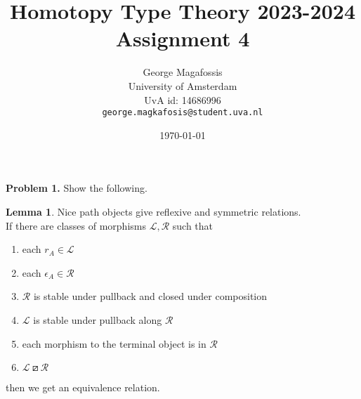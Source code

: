 \documentclass{article}
\title{Homotopy Type Theory 2023-2024\\
       Assignment 4
      }
\date{\today}
\author{George Magafossis \\
University of Amsterdam \\
UvA id: 14686996 \\
\texttt{george.magkafosis@student.uva.nl}}
\theoremstyle{definition}
\newtheorem{lemma}[definition]{Lemma}
\begin{document}
\maketitle

\noindent\textbf{Problem 1.} Show the following.

\begin{lemma}
    \label{lem:equivalence relation}
    Nice path objects give reflexive and symmetric relations. \\
    If there are classes of morphisms $\mathcal L, \mathcal R$ such that
    \begin{enumerate}[(1)]
     \item each $r_A \in \mathcal L$
     \item each $\epsilon_A \in \mathcal R$
     \item $\mathcal R$ is stable under pullback and closed under composition
     \item $\mathcal L$ is stable under pullback along $\mathcal R$
     \item each morphism to the terminal object is in $\mathcal R$
     \item $\mathcal L \boxslash \mathcal R$
    \end{enumerate}
    then we get an equivalence relation.
\end{lemma}
\end{document}
